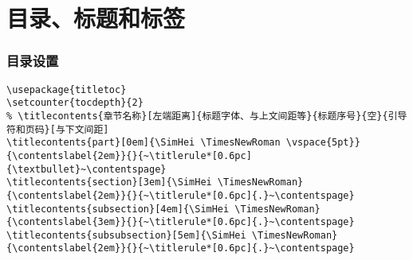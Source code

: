 \part{目录、标题和标签}
\section{目录设置}
\begin{lstlisting}[style = LaTeX_TeXworks]
\usepackage{titletoc}			
\setcounter{tocdepth}{2}
% \titlecontents{章节名称}[左端距离]{标题字体、与上文间距等}{标题序号}{空}{引导符和页码}[与下文间距]
\titlecontents{part}[0em]{\SimHei \TimesNewRoman \vspace{5pt}}{\contentslabel{2em}}{}{~\titlerule*[0.6pc]{\textbullet}~\contentspage}
\titlecontents{section}[3em]{\SimHei \TimesNewRoman}{\contentslabel{2em}}{}{~\titlerule*[0.6pc]{.}~\contentspage}
\titlecontents{subsection}[4em]{\SimHei \TimesNewRoman}{\contentslabel{3em}}{}{~\titlerule*[0.6pc]{.}~\contentspage}
\titlecontents{subsubsection}[5em]{\SimHei \TimesNewRoman}{\contentslabel{2em}}{}{~\titlerule*[0.6pc]{.}~\contentspage}
\end{lstlisting}
